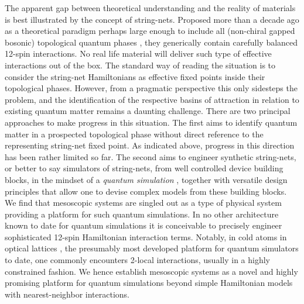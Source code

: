 \documentclass[twocolumn,floats,prx,showpacs]{revtex4-1}
\begin{document}
The apparent gap between theoretical understanding and the reality of materials is best illustrated by the concept of string-nets. Proposed more than a decade ago as a theoretical paradigm perhaps large enough to include all (non-chiral gapped bosonic) topological quantum phases \cite{Levin2005,LevinWen,Wen2017}, they generically contain carefully balanced 12-spin interactions. No real life material will deliver such type of effective interactions out of the box. The standard way of reading the situation is to consider the string-net Hamiltonians as effective fixed points inside their topological phases. However, from a pragmatic perspective this only sidesteps the problem, and the identification of the respective basins of attraction in relation to existing quantum matter remains a daunting challenge. 
%
There are two principal approaches to make progress in this situation. The first aims to identify quantum matter in a prospected topological phase without direct reference to the representing string-net fixed point. As indicated above, progress in this direction has been rather limited so far.
The second aims to engineer synthetic string-nets, or better to say simulators of string-nets, from well controlled device building blocks, in the
mindset of a \emph{quantum simulation} \cite{CiracZollerSimulation,Roadmap}, 
together with versatile design principles that allow one to devise complex models from these building blocks. We find that mesoscopic systems are singled out as a type of physical system providing a platform for such quantum simulations. In no other architecture known to date for quantum simulations it is conceivable to precisely engineer sophisticated 12-spin Hamiltonian interaction terms. Notably, in cold atoms in optical lattices
\cite{BlochSimulation}, 
the presumably most
developed platform for quantum simulators to date,
one commonly encounters 2-local interactions, usually in a highly constrained fashion.
We hence establish mesoscopic systems as a novel  and highly promising platform for quantum simulations beyond simple Hamiltonian models with nearest-neighbor interactions.
\end{document}

